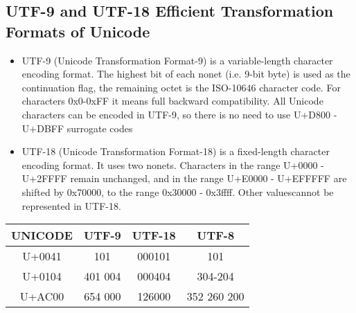 \documentclass{article}
\begin{document}
\subsection{UTF-9 and UTF-18
              Efficient Transformation Formats of Unicode}
\begin{itemize}
    \item UTF-9 (Unicode Transformation Format-9) is a variable-length character encoding format. The highest bit of each nonet (i.e. 9-bit byte) is used as the continuation flag, the remaining octet is the ISO-10646 character code. For characters 0x0-0xFF it means full backward compatibility. All Unicode characters can be encoded in UTF-9, so there is no need to use U+D800 - U+DBFF surrogate codes
    \item UTF-18 (Unicode Transformation Format-18) is a fixed-length character encoding format. It uses two nonets. Characters in the range U+0000 - U+2FFFF remain unchanged, and in the range U+E0000 - U+EFFFFF are shifted by 0x70000, to the range 0x30000 - 0x3ffff. Other values ​​cannot be represented in UTF-18. \cite{UTF8UTF16Authors}
\end{itemize}
\begin{center}
 \begin{tabular}{| c | c | c | c||} 
 \hline
 UNICODE & UTF-9 & UTF-18 & UTF-8 \\ [0.5ex] 
 \hline\hline
 	U+0041 & 101 & 000101 & 101 \\ 
 \hline
  U+0104 & 401 004 & 000404 & 304-204 \\
 \hline
  U+AC00 & 654 000 &  126000 & 352 260 200 \\
 \hline
\end{tabular}
\end{center}
\end{document}
